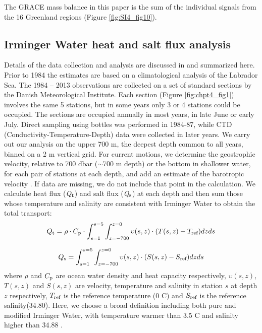 The GRACE mass balance in this paper is the sum of the individual signals from the 16 Greenland regions (Figure \ref{fig:SI4_fig10}).

\subsection{Irminger Water heat and salt flux analysis}
Details of the data collection and analysis are discussed in \citet{myers2007b} and summarized here.  Prior to 1984 the estimates are based on a climatological analysis of the Labrador Sea.  The 1984 – 2013 observations are collected on a set of standard sections by the Danish Meteorological Institute.   Each section (Figure \ref{fig:chpt4_fig1}) involves the same 5 stations, but in some years only 3 or 4 stations could be occupied.  The sections are occupied annually in most years, in late June or early July.  Direct sampling using bottles was performed in 1984-87, while CTD (Conductivity-Temperature-Depth) data were collected in later years.  We carry out our analysis on the upper 700 m, the deepest depth common to all years, binned on a 2 m vertical grid.  For current motions, we determine the geostrophic velocity, relative to 700 dbar ($\sim$700 m depth) or the bottom in shallower water, for each pair of stations at each depth, and add an estimate of the barotropic velocity \cite[]{myers2009}.  If data are missing, we do not include that point in the calculation.  We calculate heat flux (\textit{Q}$_{\textup{t}}$) and salt flux (\textit{Q}$_{\textup{s}}$) at each depth and then sum those whose temperature and salinity are consistent with Irminger Water to obtain the total transport:
\begin{equation}
\begin{aligned}
Q_{\textup{t}}=\rho \cdot C_{\textup{p}} \cdot \int_{s=1}^{s=5} \int_{z=-700}^{z=0} \upsilon(s,z) \cdot (T(s,z)-T_{\textup{ref}})dzds
\end{aligned} 
\end{equation} 

\begin{equation}
\begin{aligned}
Q_{\textup{s}}=\int_{s=1}^{s=5} \int_{z=-700}^{z=0} \upsilon(s,z) \cdot (S(s,z)-S_{\textup{ref}})dzds
\end{aligned} 
\end{equation}
where $\rho$ and $C_{\textup{p}}$ are ocean water density and heat capacity respectively, $\upsilon(s,z)$,$T(s,z)$ and $S(s,z)$ are velocity, temperature and salinity in station $s$ at depth $z$ respectively, $T_{\textup{ref}}$ is the reference temperature (0 \textordmasculine C) and $S_{\textup{ref}}$ is the reference salinity(34.80).  Here, we choose a broad definition including both pure and modified Irminger Water, with temperature warmer than 3.5 \textordmasculine C and salinity higher than 34.88 \cite[]{myers2007b}.

